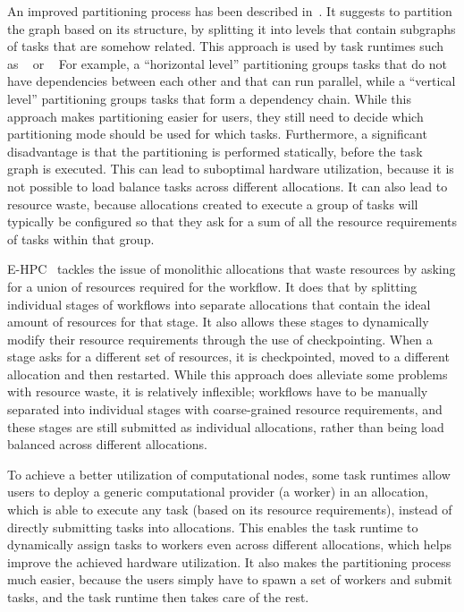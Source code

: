 An improved partitioning process has been described in~\cite{zhang_batch_scheduling}. It suggests to
partition the graph based on its structure, by splitting it into levels that contain subgraphs of
tasks that are somehow related. This approach is used by task runtimes such as
\pegasus{}~\cite{pegasus} or \autosubmit~\cite{autosubmit} For example,
a ``horizontal level'' partitioning groups tasks that do not have dependencies between each other
and that can run parallel, while a ``vertical level'' partitioning groups tasks that form a
dependency chain. While this approach makes partitioning easier for users, they still need to
decide which partitioning mode should be used for which tasks. Furthermore, a significant
disadvantage is that the partitioning is performed statically, before the task graph is executed.
This can lead to suboptimal hardware utilization, because it is not possible to load balance tasks
across different allocations. It can also lead to resource waste, because allocations created to
execute a group of tasks will typically be configured so that they ask for a sum of all the
resource requirements of tasks within that group.

\textsc{E-HPC}~\cite{ehpc} tackles the issue of monolithic allocations that
waste resources by asking for a union of resources required for the workflow. It does that by
splitting individual stages of workflows into separate allocations that contain the ideal amount of
resources for that stage. It also allows these stages to dynamically modify their resource
requirements through the use of checkpointing. When a stage asks for a different set of resources,
it is checkpointed, moved to a different allocation and then restarted. While this approach does
alleviate some problems with resource waste, it is relatively inflexible; workflows have to be
manually separated into individual stages with coarse-grained resource requirements, and these
stages are still submitted as individual allocations, rather than being load balanced across
different allocations.

To achieve a better utilization of computational nodes, some task runtimes allow users to deploy a
generic computational provider (a worker) in an allocation, which is able to execute any task
(based on its resource requirements), instead of directly submitting tasks into allocations. This
enables the task runtime to dynamically assign tasks to workers even across different allocations,
which helps improve the achieved hardware utilization. It also makes the partitioning process much
easier, because the users simply have to spawn a set of workers and submit tasks, and the task
runtime then takes care of the rest.

